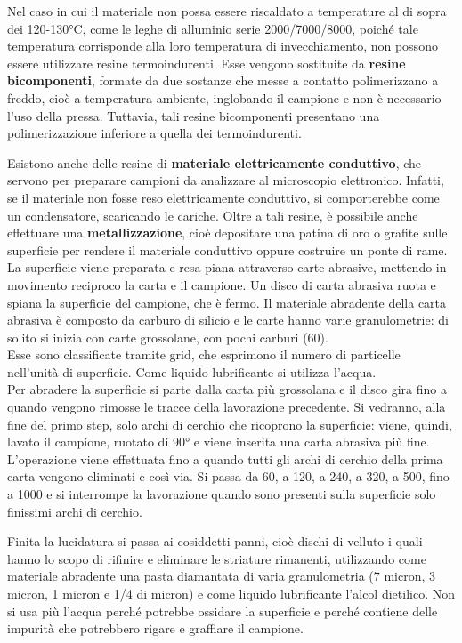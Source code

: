 Nel caso in cui il materiale non possa essere riscaldato a temperature al di sopra dei 120-130°C, come le leghe di alluminio serie 2000/7000/8000, poiché tale temperatura corrisponde alla loro temperatura di invecchiamento, non possono essere utilizzare resine termoindurenti. Esse vengono sostituite da \textbf{resine bicomponenti}, formate da due sostanze che messe a contatto polimerizzano a freddo, cioè a temperatura ambiente, inglobando il campione e non è necessario l’uso della pressa. Tuttavia, tali resine bicomponenti presentano una polimerizzazione inferiore a quella dei termoindurenti.

Esistono anche delle resine di \textbf{materiale elettricamente conduttivo}, che servono per preparare campioni da analizzare al microscopio elettronico. Infatti, se il materiale non fosse reso elettricamente conduttivo, si comporterebbe come un condensatore, scaricando le cariche. Oltre a tali resine, è possibile anche effettuare una \textbf{metallizzazione}, cioè depositare una patina di oro o grafite sulle superficie per rendere il materiale conduttivo oppure costruire un ponte di rame.\\

La superficie viene preparata e resa piana attraverso carte abrasive, mettendo in movimento reciproco la carta e il campione. Un disco di carta abrasiva ruota e spiana la superficie del campione, che è fermo. Il materiale abradente della carta abrasiva è composto da carburo di silicio e le carte hanno varie granulometrie: di solito si inizia con carte grossolane, con pochi carburi (60).\\
Esse sono classificate tramite grid, che esprimono il numero di particelle nell’unità di superficie. Come liquido lubrificante si utilizza l’acqua.\\
Per abradere la superficie si parte dalla carta più grossolana e il disco gira fino a quando vengono rimosse le tracce della lavorazione precedente. Si vedranno, alla fine del primo step, solo archi di cerchio che ricoprono la superficie: viene, quindi, lavato il campione, ruotato di 90° e viene inserita una carta abrasiva più fine. L’operazione viene effettuata fino a quando tutti gli archi di cerchio della prima carta vengono eliminati e così via. Si passa da 60, a 120, a 240, a 320, a 500, fino a 1000 e si interrompe la lavorazione quando sono presenti sulla superficie solo finissimi archi di cerchio.

Finita la lucidatura si passa ai cosiddetti panni, cioè dischi di velluto i quali hanno lo scopo di rifinire e eliminare le striature rimanenti, utilizzando come materiale abradente una pasta diamantata di varia granulometria (7 micron, 3 micron, 1 micron e 1/4 di micron) e come liquido lubrificante l’alcol dietilico. Non si usa più l’acqua perché potrebbe ossidare la superficie e perché contiene delle impurità che potrebbero rigare e graffiare il campione.

